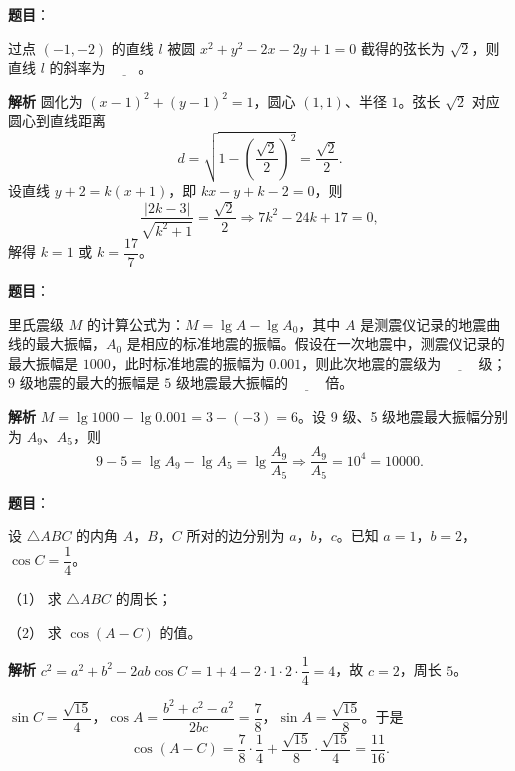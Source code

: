 \begin{answer}

\textbf{题目}：

过点 $(-1,-2)$ 的直线 $l$ 被圆 $x^2+y^2-2x-2y+1=0$ 截得的弦长为 $\sqrt2$，则直线 $l$ 的斜率为 $\underline{\qquad}$。

\textbf{解析}
圆化为 $(x-1)^2+(y-1)^2=1$，圆心 $(1,1)$、半径 $1$。弦长 $\sqrt2$ 对应圆心到直线距离
\nopagebreak[4]
\[d=\sqrt{1-\left(\frac{\sqrt2}2\right)^2}=\frac{\sqrt2}2.\]
设直线 $y+2=k(x+1)$，即 $kx-y+k-2=0$，则
\nopagebreak[4]
\[\frac{|2k-3|}{\sqrt{k^2+1}}=\frac{\sqrt2}2\Longrightarrow7k^2-24k+17=0,\]
解得 $k=1$ 或 $k=\dfrac{17}7$。


\end{answer}
\begin{answer}

\textbf{题目}：

里氏震级 $M$ 的计算公式为：$M=\lg A-\lg A_0$，其中 $A$ 是测震仪记录的地震曲线的最大振幅，$A_0$ 是相应的标准地震的振幅。假设在一次地震中，测震仪记录的最大振幅是 $1000$，此时标准地震的振幅为 $0.001$，则此次地震的震级为 $\underline{\qquad}$ 级；$9$ 级地震的最大的振幅是 $5$ 级地震最大振幅的 $\underline{\qquad}$ 倍。

\textbf{解析}
$M=\lg1000-\lg0.001=3-(-3)=6$。设 9 级、5 级地震最大振幅分别为 $A_9$、$A_5$，则
\nopagebreak[4]
\[9-5=\lg A_9-\lg A_5=\lg\frac{A_9}{A_5}\Longrightarrow\frac{A_9}{A_5}=10^4=10000.\]


\end{answer}
\begin{answer}

\textbf{题目}：

设 $\triangle ABC$ 的内角 $A$，$B$，$C$ 所对的边分别为 $a$，$b$，$c$。已知 $a=1$，$b=2$，$\cos C=\dfrac14$。

（1） 求 $\triangle ABC$ 的周长；

（2） 求 $\cos(A-C)$ 的值。

\textbf{解析}
$c^2=a^2+b^2-2ab\cos C=1+4-2\cdot1\cdot2\cdot\dfrac14=4$，故 $c=2$，周长 $5$。

$\sin C=\dfrac{\sqrt{15}}4$，$\cos A=\dfrac{b^2+c^2-a^2}{2bc}=\dfrac78$，$\sin A=\dfrac{\sqrt{15}}8$。于是
\nopagebreak[4]
\[\cos(A-C)=\frac78\cdot\frac14+\frac{\sqrt{15}}8\cdot\frac{\sqrt{15}}4=\frac{11}{16}.\]



\end{answer}
